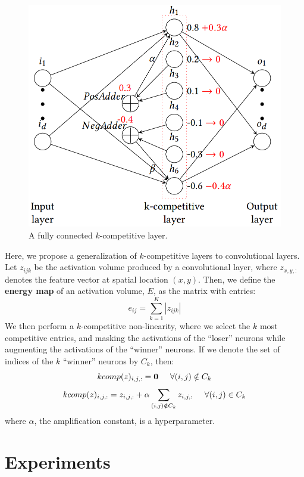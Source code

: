 \documentclass{vldb}
\begin{document}
\begin{figure}[h]
\centering
\includegraphics[width=.8\linewidth]{k_complayer.png}
\caption{\textmd{A fully connected $k$-competitive layer.}}
\end{figure}

Here, we propose a generalization of $k$-competitive layers to convolutional layers. Let $z_{ijk}$ be the activation volume produced by a convolutional layer, where $z_{x,y,:}$ denotes the feature vector at spatial location $(x,y)$. Then, we define the \textbf{energy map} of an activation volume, $E$, as the matrix with entries:
$$e_{ij} = \sum_{k=1}^K |z_{ijk}|$$
We then perform a $k$-competitive non-linearity, where we select the $k$ most competitive entries, and masking the activations of the ``loser'' neurons while augmenting the activations of the ``winner'' neurons. If we denote the set of indices of the $k$ ``winner'' neurons by $C_k$, then:
$$kcomp(z)_{i,j,:} = \textbf{0} \hspace{0.5cm} \forall (i,j) \notin C_k$$
$$kcomp(z)_{i,j,:} = z_{i,j,:} + \alpha\sum_{(i,j) \notin C_k} z_{i,j,:} \hspace{0.5cm} \forall (i,j) \in C_k$$
where $\alpha$, the amplification constant, is a hyperparameter.

\section{Experiments}
\end{document}
